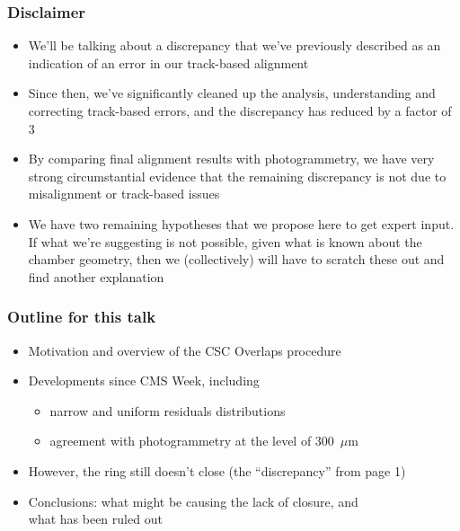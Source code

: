 \documentclass[compress]{beamer}
\begin{document}
\small

\begin{frame}
\frametitle{Disclaimer}
\begin{itemize}\setlength{\itemsep}{0.35 cm}

\item We'll be talking about a discrepancy that we've previously
  described as an indication of an error in our track-based alignment

\item Since then, we've significantly cleaned up the analysis,
  understanding and correcting track-based errors, and the
  discrepancy has reduced by a factor of 3

\item By comparing final alignment results with photogrammetry, we
  have very strong circumstantial evidence that the remaining
  discrepancy is not due to misalignment or track-based issues

\item We have two remaining hypotheses that we propose here to get
  expert input.  If what we're suggesting is not possible, given what
  is known about the chamber geometry, then we (collectively) will
  have to scratch these out and find another explanation

\end{itemize}
\end{frame}

\begin{frame}
\frametitle{Outline for this talk}

\begin{itemize}\setlength{\itemsep}{0.5 cm}
\item Motivation and overview of the CSC Overlaps procedure
\item Developments since CMS Week, including
\begin{itemize}\setlength{\itemsep}{0.1 cm}
\item narrow and uniform residuals distributions
\item agreement with photogrammetry at the level of 300~$\mu$m
\end{itemize}
\item However, the ring still doesn't close (the ``discrepancy'' from page 1)
\item Conclusions: what might be causing the lack of closure, and \\ what has been ruled out
\end{itemize}

\end{frame}
\end{document}
